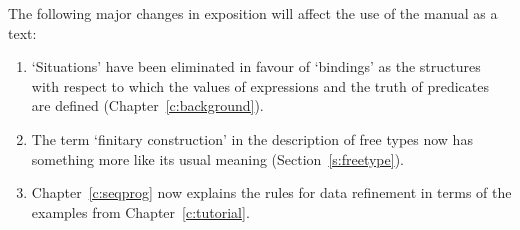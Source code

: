 The following major changes in exposition will affect the use of the
manual as a text:
\begin{enumerate}
\item `Situations' have been eliminated in favour of `bindings' as
	the structures with respect to which the values of
	expressions and the truth of predicates are defined
	(Chapter~\ref{c:background}).

\item The term `finitary construction' in the description of free
	types now has something more like its usual meaning
	(Section~\ref{s:freetype}).

\item Chapter~\ref{c:seqprog} now explains the rules for data
	refinement in terms of the examples from
	Chapter~\ref{c:tutorial}.
\end{enumerate}









